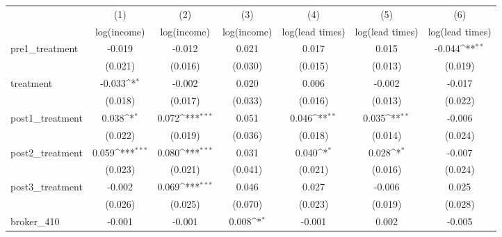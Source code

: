 {
\def\sym#1{\ifmmode^{#1}\else\(^{#1}\)\fi}
\begin{tabular}{l*{6}{c}}
\toprule
            &\multicolumn{1}{c}{(1)}&\multicolumn{1}{c}{(2)}&\multicolumn{1}{c}{(3)}&\multicolumn{1}{c}{(4)}&\multicolumn{1}{c}{(5)}&\multicolumn{1}{c}{(6)}\\
            &\multicolumn{1}{c}{log(income)}&\multicolumn{1}{c}{log(income)}&\multicolumn{1}{c}{log(income)}&\multicolumn{1}{c}{log(lead times)}&\multicolumn{1}{c}{log(lead times)}&\multicolumn{1}{c}{log(lead times)}\\
\midrule
pre1\_treatment&      -0.019         &      -0.012         &       0.021         &       0.017         &       0.015         &      -0.044\sym{**} \\
            &     (0.021)         &     (0.016)         &     (0.030)         &     (0.015)         &     (0.013)         &     (0.019)         \\
\addlinespace
treatment   &      -0.033\sym{*}  &      -0.002         &       0.020         &       0.006         &      -0.002         &      -0.017         \\
            &     (0.018)         &     (0.017)         &     (0.033)         &     (0.016)         &     (0.013)         &     (0.022)         \\
\addlinespace
post1\_treatment&       0.038\sym{*}  &       0.072\sym{***}&       0.051         &       0.046\sym{**} &       0.035\sym{**} &      -0.006         \\
            &     (0.022)         &     (0.019)         &     (0.036)         &     (0.018)         &     (0.014)         &     (0.024)         \\
\addlinespace
post2\_treatment&       0.059\sym{***}&       0.080\sym{***}&       0.031         &       0.040\sym{*}  &       0.028\sym{*}  &      -0.007         \\
            &     (0.023)         &     (0.021)         &     (0.041)         &     (0.021)         &     (0.016)         &     (0.024)         \\
\addlinespace
post3\_treatment&      -0.002         &       0.069\sym{***}&       0.046         &       0.027         &      -0.006         &       0.025         \\
            &     (0.026)         &     (0.025)         &     (0.070)         &     (0.023)         &     (0.019)         &     (0.028)         \\
\addlinespace
broker\_410  &      -0.001         &      -0.001         &       0.008\sym{*}  &      -0.001         &       0.002         &      -0.005         \\

\end{tabular}}
